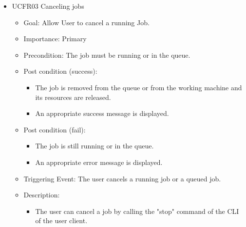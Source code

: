 \begin{itemize}
    \item UCFR03 Canceling jobs
    \begin{itemize}
      \item Goal: Allow User to cancel a running Job.
      \item Importance: Primary
      \item Precondition: The job must be running or in the queue.
      \item Post condition (success):
      \begin{itemize}
        \item The job is removed from the queue or from the working machine and its resources are released.
        \item An appropriate success message is displayed.
      \end{itemize}  
      \item Post condition (fail):
      \begin{itemize}
        \item The job is still running or in the queue.
        \item An appropriate error message is displayed.
      \end{itemize}
      \item Triggering Event: The user cancels a running job or a queued job.
      \item Description:
      \begin{itemize}
        \item   The user can cancel a job by calling the "stop" command of the CLI of the user client.
      \end{itemize}
    \end{itemize}


\end{itemize}

